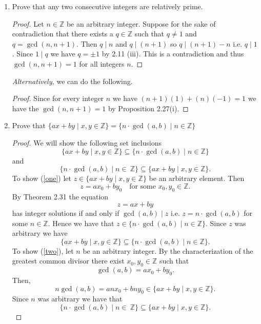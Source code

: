 \documentclass[12pt,letterpaper]{article}
\newcommand{\zz}{\mathbb Z}    %
\theoremstyle{plain}
\theoremstyle{definition}
\begin{document}
\begin{enumerate}[{\bf1.}]
\begin{proof}
\end{proof}
\newpage
\item Prove that any two consecutive integers are relatively prime. 
\begin{proof}Let $n\in \zz$ be an arbitrary integer. Suppose for the sake of contradiction that there exists a $q\in \zz$ such that $q\neq 1$ and $q=\gcd(n,n+1)$. Then $q\mid n$ and $q\mid (n+1)$ so $q\mid (n+1)-n$ i.e. $q\mid 1$. Since $1\mid q$ we have $q=\pm 1$ by 2.11 (iii). This is a contradiction and thus $\gcd(n,n+1)=1$ for all integers $n$.  
\end{proof}
\emph{Alternatively,} we can do the following.
\begin{proof} Since for every integer $n$ we have $(n+1)(1)+(n)(-1)=1$ we have the $\gcd(n,n+1)=1$ by Proposition 2.27(i). 
\end{proof}
\item Prove that $\{ax+by\mid x,y\in \mathbb{Z}\}=\{n\cdot \gcd(a,b) \mid n\in \mathbb{Z}\}$
\begin{proof}We will show the following set inclusions  \begin{equation}\label{one}\{ax+by\mid x,y\in \mathbb{Z}\}\subseteq\{n\cdot \gcd(a,b) \mid n\in \mathbb{Z}\}\end{equation} and  \begin{equation}\label{two}\{n\cdot \gcd(a,b) \mid n\in~ \mathbb{Z}\}\subseteq  \{ax+by\mid x,y\in \mathbb{Z}\}.\end{equation}
To show (\ref{one}) let $z\in \{ax+by\mid x,y\in \mathbb{Z}\}$ be an arbitrary element. Then 
\[z=ax_0+by_0\ \ \ \text{ for some }x_0,y_0\in \zz.\] By Theorem 2.31 the equation 
\[z=ax+by\] has integer solutions if and only if $\gcd(a,b)\mid z$ i.e. $z=n\cdot \gcd(a,b)$ for some $n\in \zz$. Hence we have that $z\in \{n\cdot \gcd(a,b) \mid n\in \mathbb{Z}\}$. Since $z$ was arbitrary we have 
\[\{ax+by\mid x,y\in \mathbb{Z}\}\subseteq\{n\cdot \gcd(a,b) \mid n\in \mathbb{Z}\}.\]
To show (\ref{two}), let $n$ be an arbitrary integer. By the characterization of the greatest common divisor there exist $x_0, y_0\in \zz$ such that 
\[\gcd(a,b)=ax_0+by_0.\] 
Then, 
\[n\gcd(a,b)=anx_0+bny_0\in \{ax+by\mid x,y\in \mathbb{Z}\}.\]
Since $n$ was arbitrary we have that 
\[\{n\cdot \gcd(a,b) \mid n\in~ \mathbb{Z}\}\subseteq  \{ax+by\mid x,y\in \mathbb{Z}\}.\]
\end{proof}
\end{enumerate}
\end{document}
